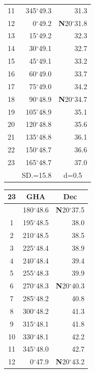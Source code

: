 \documentclass[10pt, a4paper]{report}
\begin{document}
\begin{scriptsize}
\begin{tabular*}{0.2\textwidth}[t]{@{\extracolsep{\fill}}|c|rr|}
11 & 345$^\circ$49.3 & 31.3\\[2Pt]
12 & 0$^\circ$49.2 & \textbf{N}20$^\circ$31.8\\
13 & 15$^\circ$49.2 & 32.3\\
14 & 30$^\circ$49.1 & 32.7\\
15 & 45$^\circ$49.1 & \raisebox{0.24ex}{\boldmath$\cdot$~\boldmath$\cdot$~~}33.2\\
16 & 60$^\circ$49.0 & 33.7\\
17 & 75$^\circ$49.0 & 34.2\\[2Pt]
18 & 90$^\circ$48.9 & \textbf{N}20$^\circ$34.7\\
19 & 105$^\circ$48.9 & 35.1\\
20 & 120$^\circ$48.8 & 35.6\\
21 & 135$^\circ$48.8 & \raisebox{0.24ex}{\boldmath$\cdot$~\boldmath$\cdot$~~}36.1\\
22 & 150$^\circ$48.7 & 36.6\\
23 & 165$^\circ$48.7 & 37.0\\
\hline
\rule{0pt}{2.4ex} & \multicolumn{1}{c}{SD.=15.8} & \multicolumn{1}{c|}{d=0.5}\\
\hline
\end{tabular*}\noindent
\begin{tabular*}{0.2\textwidth}[t]{@{\extracolsep{\fill}}|c|rr|}
\hline
\multicolumn{1}{|c|}{\rule{0pt}{2.6ex}\textbf{23}} & \multicolumn{1}{c}{\textbf{GHA}} & \multicolumn{1}{c|}{\textbf{Dec}}\\
\hline\rule{0pt}{2.6ex}\noindent
0 & 180$^\circ$48.6 & \textbf{N}20$^\circ$37.5\\
1 & 195$^\circ$48.5 & 38.0\\
2 & 210$^\circ$48.5 & 38.5\\
3 & 225$^\circ$48.4 & \raisebox{0.24ex}{\boldmath$\cdot$~\boldmath$\cdot$~~}38.9\\
4 & 240$^\circ$48.4 & 39.4\\
5 & 255$^\circ$48.3 & 39.9\\[2Pt]
6 & 270$^\circ$48.3 & \textbf{N}20$^\circ$40.3\\
7 & 285$^\circ$48.2 & 40.8\\
8 & 300$^\circ$48.2 & 41.3\\
9 & 315$^\circ$48.1 & \raisebox{0.24ex}{\boldmath$\cdot$~\boldmath$\cdot$~~}41.8\\
10 & 330$^\circ$48.1 & 42.2\\
11 & 345$^\circ$48.0 & 42.7\\[2Pt]
12 & 0$^\circ$47.9 & \textbf{N}20$^\circ$43.2\\

\end{tabular*}
\end{scriptsize}
\end{document}

